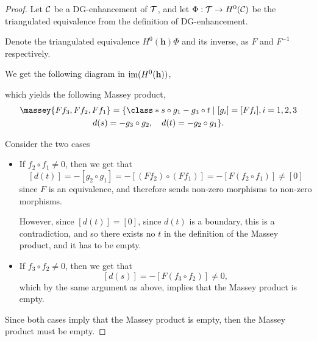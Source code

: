 \begin{proof}
    Let \( {\mathcal{C}} \) be a DG-enhancement of \( {\mathcal{T}} \), and let \( \Phi: {\mathcal{T}} \to H^0({\mathcal{C}}) \) be the triangulated equivalence from the definition of DG-enhancement.

    Denote the triangulated equivalence \( H^0(\mathbf{h}) \Phi \) and its inverse, as \( F \) and \( F^{-1} \) respectively.

    We get the following diagram in \( \operatorname{im}(H^0(\mathbf{h})) \),
    \begin{center}
    \end{center}
    which yields the following Massey product,
    \begin{multline*}
        \massey{F f_3, F f_2, F f_1} =
        \{
            \class*{
                s \circ g_1 - g_3 \circ t
            }
            \mid [g_i] = [F f_i], i = 1, 2, 3 \\
            d(s) = - g_3 \circ g_2, \quad
            d(t) = - g_2 \circ g_1
        \}.
    \end{multline*}

    Consider the two cases
    \begin{itemize}
        \item {
            If \( f_2 \circ f_1 \neq 0 \), then we get that
            \[
                [d(t)] = - [g_2 \circ g_1] = - [(F f_2) \circ (F f_1)] = - [F (f_2 \circ f_1)] \neq [0]
            \]
            since \( F \) is an equivalence, and therefore sends non-zero morphisms to non-zero morphisms.

            However, since \( [d(t)] = [0] \), since \( d(t) \) is a boundary, this is a contradiction, and so there exists no \( t \) in the definition of the Massey product, and it has to be empty.
        }
        \item {
            If \( f_3 \circ f_2 \neq 0 \), then we get that
            \[
                [d(s)] = - [F (f_3 \circ f_2)] \neq 0,
            \]
            which by the same argument as above, implies that the Massey product is empty.
        }
    \end{itemize}
    Since both cases imply that the Massey product is empty, then the Massey product must be empty.
\end{proof}

